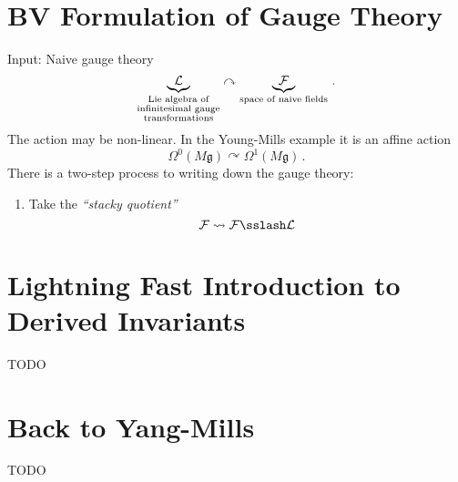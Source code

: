 \section{BV Formulation of Gauge Theory}

Input: Naive gauge theory 
\begin{equation*}
\underbrace{\mathcal{L}}_{
  \substack{\text{Lie algebra of}\\
    \text{infinitesimal gauge}\\
    \text{transformations}} } \curvearrowright
\underbrace{\mathcal{F}}_{\text{space of naive fields}}\,.
\end{equation*}
The action may be non-linear. In the Young-Mills example it is an
affine action
\begin{equation*}
  \Omega^0 (M\mathfrak{g})\curvearrowright\Omega^1 (M\mathfrak{g})\,.
\end{equation*}
There is a two-step process to writing down the gauge theory:
\begin{enumerate}
\item Take the {\em ``stacky quotient''}
  \begin{equation*}
    \Fcal \rightsquigarrow \Fcal \sslash \Lcal
  \end{equation*}
\end{enumerate}

\section{Lightning Fast Introduction to Derived Invariants}

TODO

\section{Back to Yang-Mills}

TODO